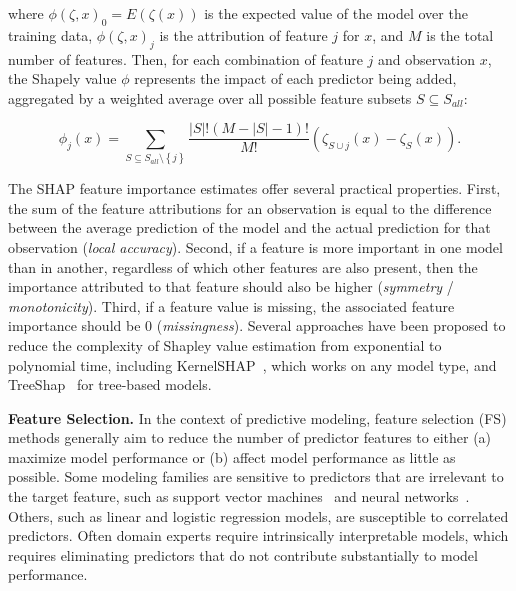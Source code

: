 \documentclass[
  oneside]{book}
\begin{document}
where \(\phi(\zeta,x)_0=E(\zeta(x))\) is the expected value of the model over the training data, \(\phi(\zeta,x)_j\) is the attribution of feature \(j\) for \(x\), and \(M\) is the total number of features.
Then, for each combination of feature \(j\) and observation \(x\), the Shapely value \(\phi\) represents the impact of each predictor being added, aggregated by a weighted average over all possible feature subsets \(S\subseteq S_{all}\):

\begin{equation}
\phi_{j}(x)=\sum_{S\subseteq S_{all}\setminus\left\{j\right\}}\frac{|S|!(M-|S|-1)!}{M!}\left(\zeta_{S\cup{j}}(x)-\zeta_S(x)\right).
\label{eq:shapley}
\end{equation}

The SHAP feature importance estimates offer several practical properties.
First, the sum of the feature attributions for an observation is equal to the difference between the average prediction of the model and the actual prediction for that observation (\emph{local accuracy}).
Second, if a feature is more important in one model than in another, regardless of which other features are also present, then the importance attributed to that feature should also be higher (\emph{symmetry} / \emph{monotonicity}).
Third, if a feature value is missing, the associated feature importance should be 0 (\emph{missingness}).
Several approaches have been proposed to reduce the complexity of Shapley value estimation from exponential to polynomial time, including KernelSHAP~\autocite{Lundberg:SHAP2017}, which works on any model type, and TreeShap~\autocite{Lundberg:TreeSHAP2019} for tree-based models.

\textbf{Feature Selection.}
In the context of predictive modeling, feature selection (FS) methods generally aim to reduce the number of predictor features to either (a) maximize model performance or (b) affect model performance as little as possible.
Some modeling families are sensitive to predictors that are irrelevant to the target feature, such as support vector machines~\autocite{Boser:SVM1992} and neural networks~\autocite{nnet,Goodfellow:DL2016}.
Others, such as linear and logistic regression models, are susceptible to correlated predictors.
Often domain experts require intrinsically interpretable models, which requires eliminating predictors that do not contribute substantially to model performance.
\end{document}
